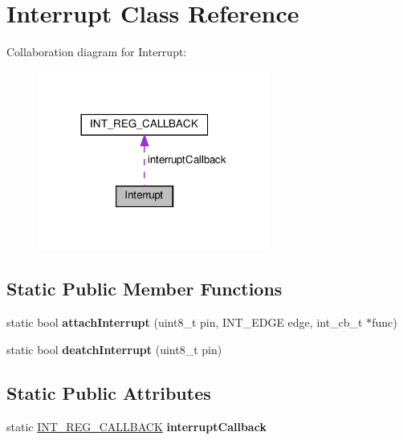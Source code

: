 \hypertarget{classInterrupt}{}\section{Interrupt Class Reference}
\label{classInterrupt}


Collaboration diagram for Interrupt\+:\nopagebreak
\begin{figure}[H]
\begin{center}
\leavevmode
\includegraphics[width=216pt]{classInterrupt__coll__graph}
\end{center}
\end{figure}
\subsection*{Static Public Member Functions}
\begin{DoxyCompactItemize}
\item 
\mbox{\label{classInterrupt_a00ff3f6de1e03971a6883b7cb72577e4}} 
static bool {\bfseries attach\+Interrupt} (uint8\+\_\+t pin, I\+N\+T\+\_\+\+E\+D\+GE edge, int\+\_\+cb\+\_\+t $\ast$func)
\item 
\mbox{\label{classInterrupt_a3e17ff585a7271441a17f1d5a7a95a47}} 
static bool {\bfseries deatch\+Interrupt} (uint8\+\_\+t pin)
\end{DoxyCompactItemize}
\subsection*{Static Public Attributes}
\begin{DoxyCompactItemize}
\item 
\mbox{\label{classInterrupt_ad98c7ff1c3a116c56b7c67b630967413}} 
static \hyperlink{structINT__REG__CALLBACK}{I\+N\+T\+\_\+\+R\+E\+G\+\_\+\+C\+A\+L\+L\+B\+A\+CK} {\bfseries interrupt\+Callback}
\end{DoxyCompactItemize}
